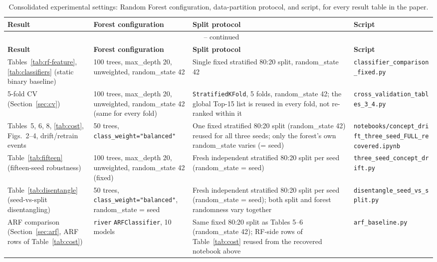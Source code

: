 \documentclass[11pt,a4paper]{article}
\begin{document}
\begin{longtable}{p{3.1cm} p{3.6cm} p{4.1cm} p{3.6cm}}
\caption{Consolidated experimental settings: Random Forest configuration,
data-partition protocol, and script, for every result table in the paper.}
\label{tab:settings} \\
\toprule
\textbf{Result} & \textbf{Forest configuration} & \textbf{Split protocol} &
\textbf{Script} \\
\midrule
\endfirsthead
\multicolumn{4}{c}{\tablename\ \thetable{} -- continued} \\
\toprule
\textbf{Result} & \textbf{Forest configuration} & \textbf{Split protocol} &
\textbf{Script} \\
\midrule
\endhead
\bottomrule
\endfoot
Tables~\ref{tab:rf-feature}, \ref{tab:classifiers} (static binary baseline) &
100 trees, max\_depth 20, unweighted, random\_state 42 &
Single fixed stratified 80:20 split, random\_state 42 &
\texttt{classifier\_comparison\_fixed.py} \\
5-fold CV (Section~\ref{sec:cv}) &
100 trees, max\_depth 20, unweighted, random\_state 42 (same for every fold) &
\texttt{StratifiedKFold}, 5 folds, random\_state 42; the global Top-15 list
is reused in every fold, not re-ranked within it &
\texttt{cross\_validation\_tables\_3\_4.py} \\
Tables~5, 6, 8, \ref{tab:cost}, Figs.~2--4, drift/retrain events &
50 trees, \texttt{class\_weight="balanced"} &
One fixed stratified 80:20 split (random\_state 42) reused for all three
seeds; only the forest's own random\_state varies (= seed) &
\texttt{notebooks/concept\_drift\_three\_seed\_FULL\_recovered.ipynb} \\
Table~\ref{tab:fifteen} (fifteen-seed robustness) &
100 trees, max\_depth 20, unweighted, random\_state 42 (fixed) &
Fresh independent stratified 80:20 split per seed (random\_state = seed) &
\texttt{three\_seed\_concept\_drift.py} \\
Table~\ref{tab:disentangle} (seed-vs-split disentangling) &
50 trees, \texttt{class\_weight="balanced"}, random\_state = seed &
Fresh independent stratified 80:20 split per seed (random\_state = seed);
both split and forest randomness vary together &
\texttt{disentangle\_seed\_vs\_split.py} \\
ARF comparison (Section~\ref{sec:arf}, ARF rows of Table~\ref{tab:cost}) &
\texttt{river} \texttt{ARFClassifier}, 10 models &
Same fixed 80:20 split as Tables 5--6 (random\_state 42); RF-side rows of
Table~\ref{tab:cost} reused from the recovered notebook above &
\texttt{arf\_baseline.py} \\

\end{longtable}
\end{document}
